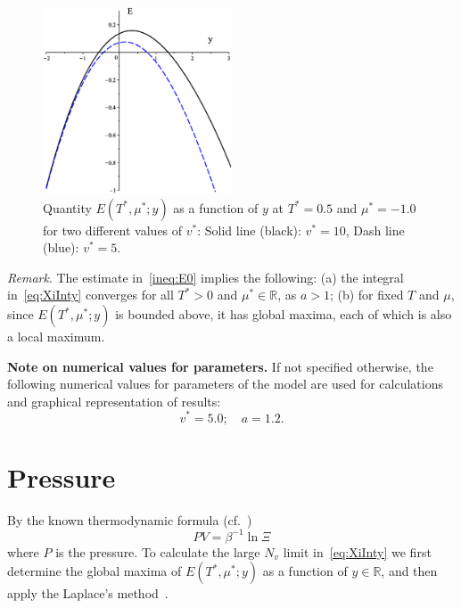 \documentclass[12pt]{article}
\numberwithin{equation}{section}
\begin{document}
	\begin{figure}[htbp]
		\includegraphics[width=0.5\textwidth,angle=0]{images/E0_vs_y2}
		\centering
		\captionsetup{width=0.6\textwidth}
		\caption{Quantity $E(T^*,\mu^*;y)$ as a function of $y$ at $T^*=0.5$ and $\mu^*=-1.0$ for two different values of $v^*$: Solid line (black): $v^* = 10$, Dash line (blue): $v^* = 5$.}
		\label{fig:E0_vs_y}
	\end{figure}
	
	\textit{Remark}. The estimate in~\eqref{ineq:E0} implies the following: (a) the integral in~\eqref{eq:XiInty} converges for all $T^*>0$ and $\mu^* \in \mathbb{R}$, as $a>1$; (b) for fixed $T$ and $\mu$, since $E(T^*,\mu^*;y)$ is bounded above, it has global maxima, each of which is also a local maximum.
	
	\textbf{Note on numerical values for parameters.} If not specified otherwise, the following numerical values for parameters of the model are used for calculations and graphical representation of results:
	\begin{equation}
		v^* = 5.0; \quad a = 1.2.
	\end{equation}
	
	
	\section{Pressure}
	By the known thermodynamic formula (cf.~\cite[(2.16)]{KKD20})
	\begin{equation}
		\label{def:eos}
		P V = \beta^{-1} \ln \Xi
	\end{equation}
	where $P$ is the pressure. To calculate the large $N_v$ limit in~\eqref{eq:XiInty} we first determine the global maxima of $E(T^*,\mu^*;y)$ as a function of $y \in \mathbb{R}$, and then apply the Laplace's method~\cite{Fedoryuk89}.
	
\end{document}
